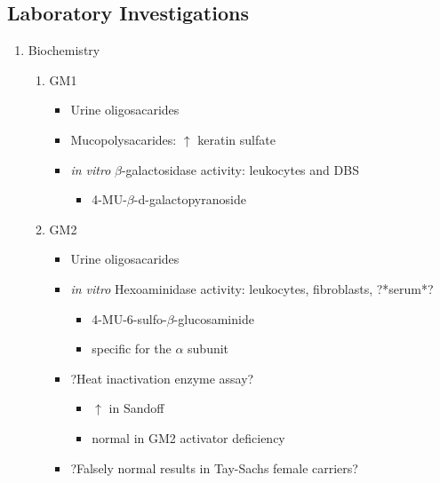 \documentclass{scrartcl}
\begin{document}
\subsection{Laboratory Investigations}
\label{sec:orgb495fcd}

\begin{enumerate}
\item Biochemistry
\label{sec:orgd2ca10b}

\begin{enumerate}
\item GM1
\label{sec:org5c3d958}

\begin{itemize}
\item Urine oligosacarides
\item Mucopolysacarides: \(\uparrow\) keratin sulfate
\item \emph{in vitro} \(\beta\)-galactosidase activity: leukocytes and DBS
\begin{itemize}
\item 4-MU-\(\beta\)-d-galactopyranoside
\end{itemize}
\end{itemize}

\item GM2
\label{sec:orgc7d21f3}
\begin{itemize}
\item Urine oligosacarides
\item \emph{in vitro} Hexoaminidase activity: leukocytes, fibroblasts, ?*serum*?
\begin{itemize}
\item 4-MU-6-sulfo-\(\beta\)-glucosaminide
\item specific for the \(\alpha\) subunit
\end{itemize}
\item ?Heat inactivation enzyme assay?
\begin{itemize}
\item \(\uparrow\) in Sandoff
\item normal in GM2 activator deficiency
\end{itemize}

\item ?Falsely normal results in Tay-Sachs female carriers?
\end{itemize}
\end{enumerate}
\end{enumerate}
\end{document}
